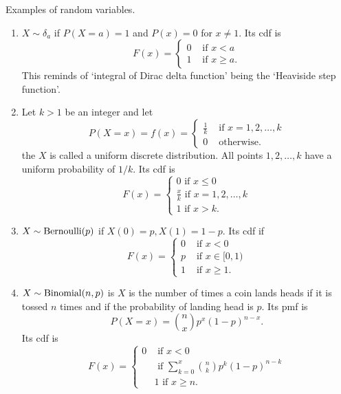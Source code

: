 \documentclass{article}
\begin{document}
Examples of random variables.
\begin{enumerate}
\item $X \sim \delta_a$ if $P(X=a) = 1$ and $P(x) = 0$ for $x \ne 1$. Its cdf is
\begin{equation}\label{c2e1}
F(x) = \begin{cases}
0 & \text{ if } x < a \\
1 & \text{ if } x \ge a.
\end{cases}
\end{equation}
This  reminds of `integral of Dirac delta function' being the `Heaviside step
function'.

\item Let $k > 1$ be an integer and let 
\begin{equation}\label{c2e2}
P(X=x) = f(x) = \begin{cases}
\frac{1}{k} & \text{ if } x = 1, 2, \ldots, k \\
0 & \text{ otherwise.}
\end{cases}
\end{equation}
the $X$ is called a uniform discrete distribution. All points $1, 2, \ldots, k$
have a uniform probability of $1/k$. Its cdf is
\begin{equation}
F(x) = \begin{cases}
0 \text{ if } x \le 0 \\
\frac{x}{k} \text{ if } x = 1, 2, \ldots, k \\
1 \text{ if } x > k.
\end{cases}
\end{equation}

\item $X \sim \text{Bernoulli}(p)$ if $X(0) = p, X(1) = 1 - p$. Its cdf if
\begin{equation}\label{c2e3}
F(x) = \begin{cases}
0 & \text{ if } x < 0 \\
p & \text{ if } x \in [0, 1) \\
1 & \text{ if } x \ge 1.
\end{cases}
\end{equation}

\item $X \sim \text{Binomial}(n, p)$ is $X$ is the number of times a coin lands heads if
it is tossed $n$ times and if the probability of landing head is $p$. Its pmf
is 
\begin{equation}\label{c2e4}
P(X=x) = \binom{n}{x}p^x(1 - p)^{n-x}.
\end{equation}
Its cdf is
\begin{equation}\label{c2e5}
F(x) = \begin{cases}
0 & \text{ if } x < 0 \\
 & \text{ if } \sum_{k=0}^x\binom{n}{k}p^k(1 - p)^{n-k} \\
 & 1 \text{ if } x \ge n.
\end{cases}
\end{equation}


\end{enumerate}
\end{document}
